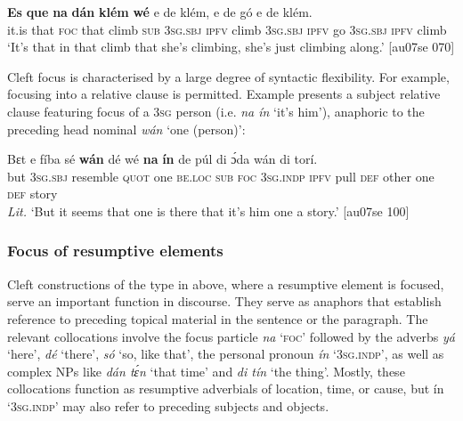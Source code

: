 \ea%
    \label{ex:key:715}
    \gll \textbf{Es}  \textbf{que}  \textbf{na}  \textbf{dán}  \textbf{klém}  \textbf{wé} e    de  klém,
e    de  gó e      de  klém.\\
it.is  that  \textsc{foc}  that  climb  \textsc{sub}  \textsc{3sg.sbj}  \textsc{ipfv}  climb
\textsc{3sg.sbj}  \textsc{ipfv}  go \textsc{3sg.sbj}    \textsc{ipfv}  climb\\

\glt ‘It’s that in that climb that she’s climbing, she’s just 
climbing along.’ [au07se 070]
\z

Cleft focus is characterised by a large degree of syntactic flexibility. For example, focusing into a relative clause is permitted. Example  presents a subject relative clause featuring focus of a \textsc{3sg} person (i.e. \textit{na ín} ‘it’s him’), anaphoric to the preceding head nominal \textit{wán} ‘one (person)’: 


\ea%
    \label{ex:key:716}
    \gll Bɛt  e    fíba      sé    \textbf{wán}    dé    wé  \textbf{na}  \textbf{ín}
de  púl  di  ɔ́da    wán    di  torí.\\
but  \textsc{3sg.sbj}  resemble    \textsc{quot}    one    \textsc{be.loc}  \textsc{sub}  \textsc{foc}  \textsc{3sg.indp}
\textsc{ipfv}  pull  \textsc{def}  other  one    \textsc{def}  story\\

\glt 
\textit{Lit.} ‘But it seems that one is there that it’s him  one a story.’ [au07se 100]
\z

\subsubsection{Focus of resumptive elements}\label{sec:7.4.3.3}

Cleft constructions of the type in  above, where a resumptive element is focused, serve an important function in discourse{\fff}. They serve as anaphors that establish reference to preceding topical material in the sentence or the paragraph. The relevant collocations involve the focus particle \textit{na} ‘\textsc{foc}’ followed by the adverbs \textit{yá} ‘here’, \textit{dé} ‘there’, \textit{só} ‘so, like that’, the personal pronoun \textit{ín} ‘\textsc{3sg.indp}’, as well as complex NPs like \textit{dán tɛ́n} ‘that time’ and \textit{di tín} ‘the thing’. Mostly, these collocations function as resumptive adverbials of location, time, or cause, but ín ‘\textsc{3sg.indp}’ may also refer to preceding subjects and objects{\fff}. 


